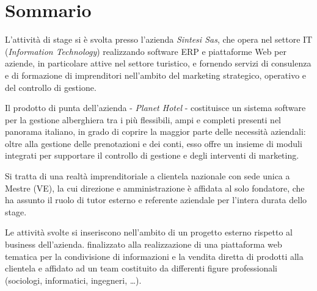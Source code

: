 \begingroup
\let\clearpage\relax
\let\cleardoublepage\relax
\let\cleardoublepage\relax

\chapter*{Sommario}
	L'attività di stage si è svolta presso l'azienda \textit{Sintesi Sas}, che opera nel settore IT (\textit{Information Technology}) realizzando software ERP e piattaforme Web per aziende, in particolare attive nel settore turistico, e fornendo servizi di consulenza e di formazione di imprenditori nell'ambito del marketing strategico, operativo e del controllo di gestione.
	
	Il prodotto di punta dell'azienda - \textit{Planet Hotel} - costituisce un sistema software per la gestione alberghiera tra i più flessibili, ampi e completi presenti nel panorama italiano, in grado di coprire la maggior parte delle necessità aziendali: oltre alla gestione delle prenotazioni e dei conti, esso offre un insieme di moduli integrati per supportare il controllo di gestione e degli interventi di marketing.

	Si tratta di una realtà imprenditoriale a clientela nazionale con sede unica a Mestre (VE), la cui direzione e amministrazione è affidata al solo fondatore, che ha assunto il ruolo di tutor esterno e referente aziendale per l'intera durata dello stage.

	Le attività svolte si inseriscono nell'ambito di un progetto esterno rispetto al business dell'azienda. finalizzato alla realizzazione di una piattaforma web tematica per la condivisione di informazioni e la vendita diretta di prodotti alla clientela e affidato ad un team costituito da differenti figure professionali (sociologi, informatici, ingegneri, \ldots).

\endgroup			

\vfill

